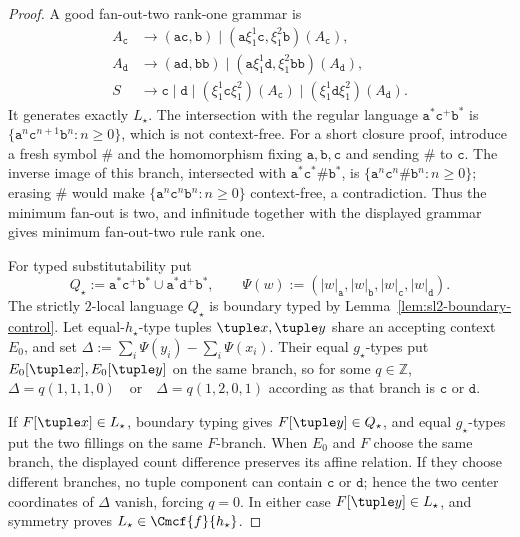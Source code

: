 \begin{proof}
A good fan-out-two rank-one grammar is
\[
\begin{aligned}
 A_{\mathtt c}
   &\to(\mathtt a\mathtt c,\mathtt b)
     \mid(\mathtt a\xi_1^1\mathtt c,\xi_1^2\mathtt b)(A_{\mathtt c}),\\
 A_{\mathtt d}
   &\to(\mathtt a\mathtt d,\mathtt b\mathtt b)
     \mid(\mathtt a\xi_1^1\mathtt d,\xi_1^2\mathtt b\mathtt b)(A_{\mathtt d}),\\
 S&\to\mathtt c\mid\mathtt d
   \mid(\xi_1^1\mathtt c\xi_1^2)(A_{\mathtt c})
   \mid(\xi_1^1\mathtt d\xi_1^2)(A_{\mathtt d}).
\end{aligned}
\]
It generates exactly $L_\star$.  The intersection with the regular language
$\mathtt a^*\mathtt c^+\mathtt b^*$ is
$\{\mathtt a^n\mathtt c^{n+1}\mathtt b^n:n\ge0\}$, which is not
context-free.  For a short closure proof, introduce a fresh symbol
$\mathtt\#$ and the homomorphism fixing $\mathtt a,\mathtt b,\mathtt c$ and
sending $\mathtt\#$ to $\mathtt c$.  The inverse image of this branch,
intersected with
$\mathtt a^*\mathtt c^*\mathtt\#\mathtt b^*$, is
$\{\mathtt a^n\mathtt c^n\mathtt\#\mathtt b^n:n\ge0\}$; erasing
$\mathtt\#$ would make $\{\mathtt a^n\mathtt c^n\mathtt b^n:n\ge0\}$
context-free, a contradiction.  Thus the minimum fan-out is two, and
infinitude together with the displayed grammar gives minimum fan-out-two rule
rank one.

For typed substitutability put
\[
 Q_\star:=\mathtt a^*\mathtt c^+\mathtt b^*
          \cup\mathtt a^*\mathtt d^+\mathtt b^*,
 \qquad
 \Psi(w):=(|w|_{\mathtt a},|w|_{\mathtt b},
            |w|_{\mathtt c},|w|_{\mathtt d}).
\]
The strictly $2$-local language $Q_\star$ is boundary typed by
Lemma~\ref{lem:sl2-boundary-control}.  Let equal-$h_\star$-type tuples
$\tuple x,\tuple y$ share an accepting context $E_0$, and set
\(\Delta:=\sum_i\Psi(y_i)-\sum_i\Psi(x_i).\)
Their equal $g_\star$-types put $E_0[\tuple x],E_0[\tuple y]$ on the same
branch, so for some $q\in\mathbb Z$,
\(\Delta=q(1,1,1,0)\quad\text{or}\quad\Delta=q(1,2,0,1)\)
according as that branch is $\mathtt c$ or $\mathtt d$.

If $F[\tuple x]\in L_\star$, boundary typing gives
$F[\tuple y]\in Q_\star$, and equal $g_\star$-types put the two fillings on
the same $F$-branch.  When $E_0$ and $F$ choose the same branch, the displayed
count difference preserves its affine relation.  If they choose different
branches, no tuple component can contain $\mathtt c$ or $\mathtt d$; hence the
two center coordinates of $\Delta$ vanish, forcing $q=0$.  In either case
$F[\tuple y]\in L_\star$, and symmetry proves
$L_\star\in\Cmcf{f}{h_\star}$.


\end{proof}
